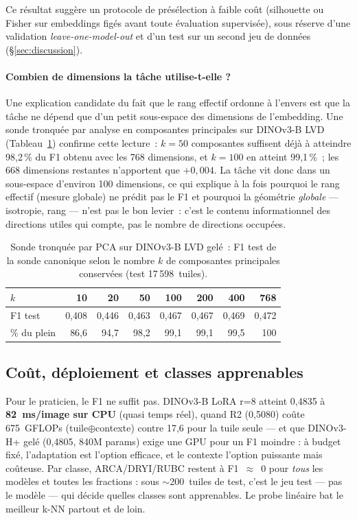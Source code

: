 \documentclass[11pt,a4paper]{article}
\begin{document}
Ce résultat suggère un protocole de présélection à faible coût (silhouette ou Fisher sur embeddings figés avant toute évaluation supervisée), sous réserve d'une validation \emph{leave-one-model-out} et d'un test sur un second jeu de données (\S\ref{sec:discussion}).

\paragraph{Combien de dimensions la tâche utilise-t-elle ?} Une explication candidate du fait que le rang effectif ordonne à l'envers est que la tâche ne dépend que d'un petit sous-espace des dimensions de l'embedding. Une sonde tronquée par analyse en composantes principales sur DINOv3-B LVD (Tableau~\ref{tab:dimprobe}) confirme cette lecture~: $k=50$ composantes suffisent déjà à atteindre 98,2\,\% du F1 obtenu avec les 768 dimensions, et $k=100$ en atteint 99,1\,\%~; les 668 dimensions restantes n'apportent que $+0{,}004$. La tâche vit donc dans un sous-espace d'environ 100 dimensions, ce qui explique à la fois pourquoi le rang effectif (mesure globale) ne prédit pas le F1 et pourquoi la géométrie \emph{globale} — isotropie, rang — n'est pas le bon levier~: c'est le contenu informationnel des directions utiles qui compte, pas le nombre de directions occupées.

\begin{table}[H]
	\centering
	\small
	\caption{Sonde tronquée par PCA sur DINOv3-B LVD gelé~: F1 test de la sonde canonique selon le nombre $k$ de composantes principales conservées (test 17\,598~tuiles).}
	\label{tab:dimprobe}
	\begin{tabular}{lrrrrrrr}
		\toprule
		$k$ & 10 & 20 & 50 & 100 & 200 & 400 & 768 \\
		\midrule
		F1 test & 0,408 & 0,446 & 0,463 & 0,467 & 0,467 & 0,469 & 0,472 \\
		\% du plein & 86,6 & 94,7 & 98,2 & 99,1 & 99,1 & 99,5 & 100 \\
		\bottomrule
	\end{tabular}
\end{table}

\subsection{Coût, déploiement et classes apprenables}
\label{sec:cost}

Pour le praticien, le F1 ne suffit pas. DINOv3-B LoRA r=8 atteint 0,4835 à \textbf{82~ms/image sur CPU} (quasi temps réel), quand R2 (0,5080) coûte 675~GFLOPs (tuile$\oplus$contexte) contre 17,6 pour la tuile seule — et que DINOv3-H+ gelé (0,4805, 840M params) exige une GPU pour un F1 moindre : à budget fixé, l'adaptation est l'option efficace, et le contexte l'option puissante mais coûteuse. Par classe, ARCA/DRYI/RUBC restent à F1~$\approx$~0 pour \emph{tous} les modèles et toutes les fractions : sous $\sim$200~tuiles de test, c'est le jeu test — pas le modèle — qui décide quelles classes sont apprenables. Le probe linéaire bat le meilleur k-NN partout et de loin.
\end{document}
